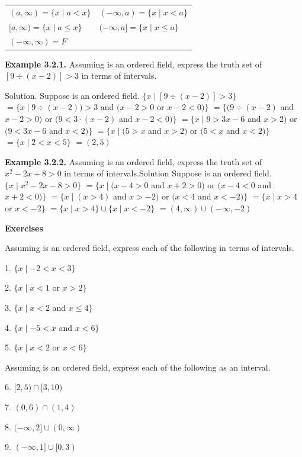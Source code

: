\begin{large}
\newpage
\begin{tabular}{l l}
$(a,\infty)= \{x \mid a < x\}$& $(-\infty,a)= \{x \mid x < a\}$ \\
$[a,\infty) = \{x \mid a \leq x\}$& $(-\infty, a] = \{ x \mid x \leq a \}$ \\
$(-\infty, \infty) = F$& \\
\end{tabular}\nl

\textbf{Example 3.2.1.} Assuming \of is an ordered field, express the truth set of $[9\div(x-2)] > 3$ in terms of intervals.\nl

Solution. Suppose \of is an ordered field.\nl
$ \{x \mid [9\div (x-2)] >3\}$ \nl
$=\{x \mid 9\div (x-2)) > 3$ and $(x-2 > 0 $ or $x-2< 0)\}$ \nl
$= \{(9\div (x-2)$ and $x - 2 > 0)$ or $(9 <3\cdot (x-2)$ and $x - 2 <0)\}$ \nl
$= \{x \mid 9 > 3x-6$ and $x > 2)$ or $(9 < 3x - 6$ and $x < 2)\} $\nl
$= \{x \mid (5 > x$ and $x > 2)$ or $(5 < x$ and $x < 2)\}$ \nl
$=\{x \mid 2< x < 5\}$ \nl
$=(2,5)$ \nl

\textbf{Example 3.2.2.} Assuming \of  is an ordered field, express the truth set of $x^{2} -2x + 8 > 0$ in terms of intervals.\nl Solution  Suppose \of is an ordered field. \nl
$\{x \mid x^{2} - 2x - 8 > 0 \}$ \nl
$= \{x \mid (x - 4 > 0$ and $x + 2 > 0)$ or $(x - 4 < 0$ and $x + 2 < 0)\} $\nl
$= \{x \mid (x > 4)$ and $x > -2)$ or $(x < 4$ and $x < -2)\} $\nl
$= \{x \mid x > 4$ or $x < -2\} $\nl
$=\{x \mid x > 4\} \cup \{x \mid x < -2\} $\nl
$=(4,\infty) \cup (-\infty,-2) $\nl

\textbf{Exercises}\nl

 Assuming \of  is an ordered field, express each of the following in terms of intervals.

1. $\{x \mid -2< x < 3\}$ \nl

2. $\{x \mid x <1$ or $x > 2\}$ \nl

3. $\{x\mid x < 2$ and $x\leq 4\}$ \nl

4. $\{x \mid -5 < x$ and $x < 6\}$  \nl

5. $\{x \mid x < 2$ or $x < 6\}$ \nl


Assuming \of  is an ordered field, express each of the following as an interval. \nl

6. $[2,5) \cap [3,10)$\nl

7. $(0,6)\cap (1,4)$\nl

8. $(-\infty,2] \cup (0,\infty) $

\newpage

9. $(-\infty,1] \cup [0,3)$\nl


\end{large}
